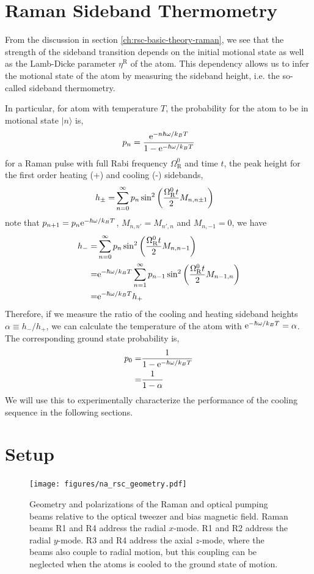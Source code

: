\section{Raman Sideband Thermometry}

From the discussion in section \ref{ch:rsc-basic-theory-raman},
we see that the strength of the sideband transition depends on the initial motional state
as well as the Lamb-Dicke parameter $\eta^{\mathrm{R}}$ of the atom.
This dependency allows us to infer the motional state of the atom
by measuring the sideband height, i.e. the so-called sideband thermometry.

In particular, for atom with temperature $T$,
the probability for the atom to be in motional state $|n\rangle$ is,
\[ p_n=\frac{\mathrm{e}^{-n\hbar\omega/k_BT}}{1-\mathrm{e}^{-\hbar\omega/k_BT}} \]
for a Raman pulse with full Rabi frequency $\Omega_{\mathrm{R}}^0$ and time $t$,
the peak height for the first order heating (+) and cooling (-) sidebands,
\begin{align*}
  h_\pm=&\sum_{n=0}^\infty p_n\sin^2{\left({\frac{\Omega_{\mathrm{R}}^0t}{2}M_{n,n\pm1}}\right)}
\end{align*}
note that $p_{n+1}=p_n\mathrm{e}^{-\hbar\omega/k_BT}$, $M_{n,n'}=M_{n',n}$ and $M_{n,-1}=0$, we have
\begin{align*}
  h_-=&\sum_{n=0}^\infty p_n\sin^2{\left({\frac{\Omega_{\mathrm{R}}^0t}{2}M_{n,n-1}}\right)}\\
  =&\mathrm{e}^{-\hbar\omega/k_BT}\sum_{n=1}^\infty p_{n-1}\sin^2{\left({\frac{\Omega_{\mathrm{R}}^0t}{2}M_{n-1,n}}\right)}\\
  =&\mathrm{e}^{-\hbar\omega/k_BT}h_+
\end{align*}
Therefore, if we measure the ratio of the cooling and heating sideband heights
$\alpha\equiv h_-/h_+$, we can calculate the temperature of the atom with
$\mathrm{e}^{-\hbar\omega/k_BT}=\alpha$.
The corresponding ground state probability is,
\begin{align*}
  p_0=&\frac{1}{1-\mathrm{e}^{-\hbar\omega/k_BT}}\\
  =&\frac{1}{1-\alpha}
\end{align*}
We will use this to experimentally characterize the performance of the cooling sequence
in the following sections.

\section{Setup}
\label{ch:rsc:setup}

\begin{figure}
  \centering
  \texttt{[image: figures/na\_rsc\_geometry.pdf]}
  \caption[Beams and field geometry for Sodium Raman sideband cooling]{
    Geometry and polarizations of the Raman and optical pumping beams relative to the
    optical tweezer and bias magnetic field.
    Raman beams R1 and R4 address the radial $x$-mode.
    R1 and R2 address the radial $y$-mode.
    R3 and R4 address the axial $z$-mode, where the beams also couple to radial motion,
    but this coupling can be neglected when the atoms is cooled to the ground state of motion.
    \label{fig:na-rsc-geometry}}
\end{figure}

